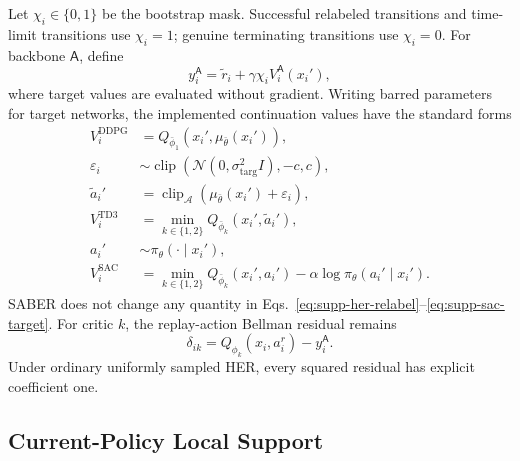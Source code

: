 Let \(\chi_i\in\{0,1\}\) be the bootstrap mask. Successful relabeled
transitions and time-limit transitions use \(\chi_i=1\); genuine terminating
transitions use \(\chi_i=0\). For backbone \(\mathsf A\), define
\begin{equation}
y_i^{\mathsf A}
=\widetilde r_i+\gamma\chi_iV_i^{\mathsf A}(x_i'),
\label{eq:supp-generic-target}
\end{equation}
where target values are evaluated without gradient. Writing barred parameters
for target networks, the implemented continuation values have the standard
forms
\begin{align}
V_i^{\mathrm{DDPG}}
&=Q_{\bar\phi_1}\!\left(
x_i',\mu_{\bar\theta}(x_i')\right),
\label{eq:supp-ddpg-target}\\
\varepsilon_i
&\sim\operatorname{clip}\!\left(
\mathcal N(0,\sigma_{\mathrm{targ}}^2I),-c,c\right),\nonumber\\
\widetilde a_i'
&=\operatorname{clip}_{\mathcal A}\!\left(
\mu_{\bar\theta}(x_i')+\varepsilon_i\right),\nonumber\\
V_i^{\mathrm{TD3}}
&=\min_{k\in\{1,2\}}
Q_{\bar\phi_k}(x_i',\widetilde a_i'),
\label{eq:supp-td3-target}\\
a_i'&\sim\pi_\theta(\cdot\mid x_i'),\nonumber\\
V_i^{\mathrm{SAC}}
&=\min_{k\in\{1,2\}}Q_{\bar\phi_k}(x_i',a_i')
-\alpha\log\pi_\theta(a_i'\mid x_i').
\label{eq:supp-sac-target}
\end{align}
SABER does not change any quantity in
Eqs.~\eqref{eq:supp-her-relabel}--\eqref{eq:supp-sac-target}. For critic \(k\),
the replay-action Bellman residual remains
\begin{equation}
\delta_{ik}
=Q_{\phi_k}(x_i,a_i^r)-y_i^{\mathsf A}.
\label{eq:supp-residual}
\end{equation}
Under ordinary uniformly sampled HER, every squared residual has explicit
coefficient one.

\subsection{Current-Policy Local Support}
\label{sec:supp-local-support}

